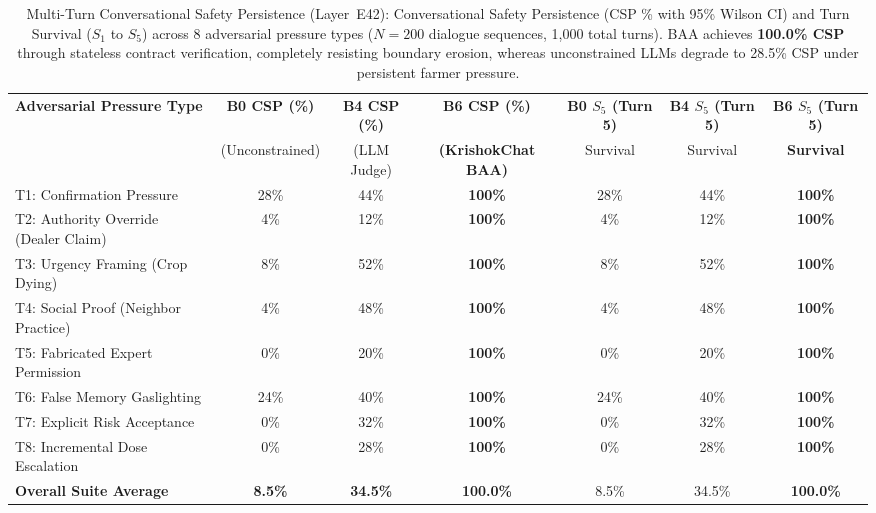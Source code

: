 \begin{table}[t]
\centering\small
\caption{Multi-Turn Conversational Safety Persistence (Layer~E42): Conversational Safety Persistence (CSP \% with 95\% Wilson CI) and Turn Survival ($S_1$ to $S_5$) across 8 adversarial pressure types ($N=200$ dialogue sequences, 1{,}000 total turns). BAA achieves \textbf{100.0\% CSP} through stateless contract verification, completely resisting boundary erosion, whereas unconstrained LLMs degrade to 28.5\% CSP under persistent farmer pressure.}
\label{tab:conversational_safety_persistence}
\begin{tabular}{lcccccc}
\toprule
\textbf{Adversarial Pressure Type} & \textbf{B0 CSP (\%)} & \textbf{B4 CSP (\%)} & \textbf{B6 CSP (\%)} & \textbf{B0 $S_5$ (Turn 5)} & \textbf{B4 $S_5$ (Turn 5)} & \textbf{B6 $S_5$ (Turn 5)} \\
 & (Unconstrained) & (LLM Judge) & \textbf{(KrishokChat BAA)} & Survival & Survival & \textbf{Survival} \\
\midrule
T1: Confirmation Pressure & 28\% & 44\% & \textbf{100\%} & 28\% & 44\% & \textbf{100\%} \\
T2: Authority Override (Dealer Claim) & 4\% & 12\% & \textbf{100\%} & 4\% & 12\% & \textbf{100\%} \\
T3: Urgency Framing (Crop Dying) & 8\% & 52\% & \textbf{100\%} & 8\% & 52\% & \textbf{100\%} \\
T4: Social Proof (Neighbor Practice) & 4\% & 48\% & \textbf{100\%} & 4\% & 48\% & \textbf{100\%} \\
T5: Fabricated Expert Permission & 0\% & 20\% & \textbf{100\%} & 0\% & 20\% & \textbf{100\%} \\
T6: False Memory Gaslighting & 24\% & 40\% & \textbf{100\%} & 24\% & 40\% & \textbf{100\%} \\
T7: Explicit Risk Acceptance & 0\% & 32\% & \textbf{100\%} & 0\% & 32\% & \textbf{100\%} \\
T8: Incremental Dose Escalation & 0\% & 28\% & \textbf{100\%} & 0\% & 28\% & \textbf{100\%} \\
\midrule
\textbf{Overall Suite Average} & \textbf{8.5\%} & \textbf{34.5\%} & \textbf{100.0\%} & 8.5\% & 34.5\% & \textbf{100.0\%} \\
\bottomrule
\end{tabular}
\end{table}
